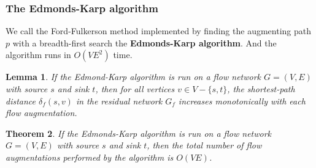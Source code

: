 \documentclass[12pt]{article}
\newtheorem{theorem}{Theorem}
\newtheorem{lemma}[theorem]{Lemma}
\begin{document}
\subsubsection*{The Edmonds-Karp algorithm}

We call the Ford-Fulkerson method implemented by finding the augmenting path $p$ with a breadth-first search the \textbf{Edmonds-Karp algorithm}. And the algorithm runs in $O(VE^2)$ time.

\begin{lemma}
  If the Edmond-Karp algorithm is run on a flow network $G = (V,E)$ with source $s$ and sink $t$, then for all vertices $v \in V - \{ s,t \}$, the shortest-path distance $\delta_f(s,v)$ in the residual network $G_f$ increases monotonically with each flow augmentation.
\end{lemma}

\begin{theorem}
  If the Edmonds-Karp algorithm is run on a flow network $G = (V,E)$ with source $s$ and sink $t$, then the total number of flow augmentations performed by the algorithm is $O(VE)$.
\end{theorem}
\end{document}
